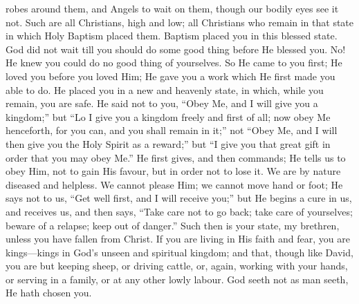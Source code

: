 robes around them, and Angels to wait on them, though our bodily eyes
see it not. Such are all Christians, high and low; all Christians who
remain in that state in which Holy Baptism placed them. Baptism placed
you in this blessed state. God did not wait till you should do some
good thing before He blessed you. No! He knew you could do no good
thing of yourselves. So He came to you first; He loved you before you
loved Him; He gave you a work which He first made you able to do. He
placed you in a new and heavenly state, in which, while you remain,
you are safe. He said not to you, ``Obey Me, and I will give you a
kingdom;'' but ``Lo I give you a kingdom freely and first of
all; now obey Me henceforth, for you can, and you shall remain in
it;'' not ``Obey Me, and I will then give you the Holy Spirit
as a reward;'' but ``I give you that great gift in order that
you may obey Me.'' He first gives, and then commands; He tells us
to obey Him, not to gain His favour, but in order not to lose it. We
are by nature diseased and helpless. We cannot please Him; we cannot
move hand or foot; He says not to us, ``Get well first, and I will
receive you;'' but He begins a cure in us, and receives us, and
then says, ``Take care not to go back; take care of yourselves;
beware of a relapse; keep out of danger.'' Such then is your
state, my brethren, unless you have fallen from Christ. If you are
living in His faith and fear, you are kings—kings in God's unseen
and spiritual kingdom; and that, though like David, you are but
keeping sheep, or driving cattle, or, again, working with your hands,
or serving in a family, or at any other lowly labour. God seeth not as
man seeth, He hath chosen you.

